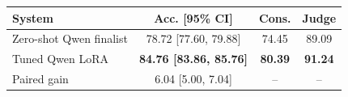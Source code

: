 \begin{tabular}{lccc}
\toprule
System & Acc. [95\% CI] & Cons. & Judge\\
\midrule
Zero-shot Qwen finalist & 78.72 [77.60, 79.88] & 74.45 & 89.09\\
Tuned Qwen LoRA & \textbf{84.76 [83.86, 85.76]} & \textbf{80.39} & \textbf{91.24}\\
\midrule
Paired gain & 6.04 [5.00, 7.04] & -- & --\\
\bottomrule
\end{tabular}
